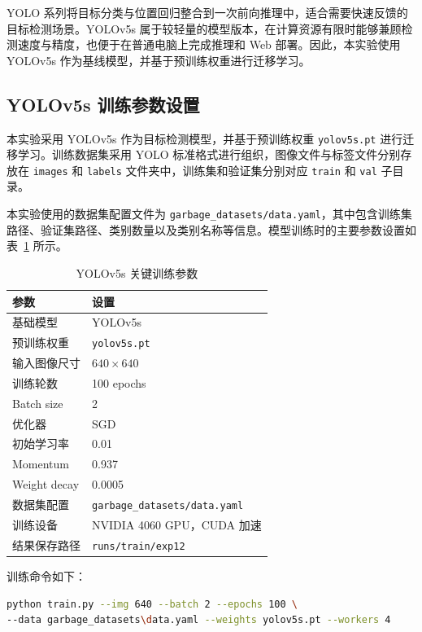 \documentclass[UTF8,a4paper,12pt]{ctexart}
\begin{document}
YOLO 系列将目标分类与位置回归整合到一次前向推理中，适合需要快速反馈的目标检测场景。YOLOv5s 属于较轻量的模型版本，在计算资源有限时能够兼顾检测速度与精度，也便于在普通电脑上完成推理和 Web 部署。因此，本实验使用 YOLOv5s 作为基线模型，并基于预训练权重进行迁移学习。

\subsection{YOLOv5s 训练参数设置}

本实验采用 YOLOv5s 作为目标检测模型，并基于预训练权重 \texttt{yolov5s.pt} 进行迁移学习。训练数据集采用 YOLO 标准格式进行组织，图像文件与标签文件分别存放在 \texttt{images} 和 \texttt{labels} 文件夹中，训练集和验证集分别对应 \texttt{train} 和 \texttt{val} 子目录。

本实验使用的数据集配置文件为 \texttt{garbage\_datasets/data.yaml}，其中包含训练集路径、验证集路径、类别数量以及类别名称等信息。模型训练时的主要参数设置如表~\ref{tab:train-params} 所示。

\begin{table}[H]
  \centering
  \caption{YOLOv5s 关键训练参数}
  \label{tab:train-params}
  \begin{tabular}{ll}
    \toprule
    参数 & 设置 \\
    \midrule
    基础模型 & YOLOv5s \\
    预训练权重 & \texttt{yolov5s.pt} \\
    输入图像尺寸 & $640\times640$ \\
    训练轮数 & 100 epochs \\
    Batch size & 2 \\
    优化器 & SGD \\
    初始学习率 & 0.01 \\
    Momentum & 0.937 \\
    Weight decay & 0.0005 \\
    数据集配置 & \texttt{garbage\_datasets/data.yaml} \\
    训练设备 & NVIDIA 4060 GPU，CUDA 加速 \\
    结果保存路径 & \texttt{runs/train/exp12} \\
    \bottomrule
  \end{tabular}
\end{table}

训练命令如下：

\begin{lstlisting}[language=bash,caption={YOLOv5s 训练命令}]
python train.py --img 640 --batch 2 --epochs 100 \
--data garbage_datasets\data.yaml --weights yolov5s.pt --workers 4
\end{lstlisting}
\end{document}
